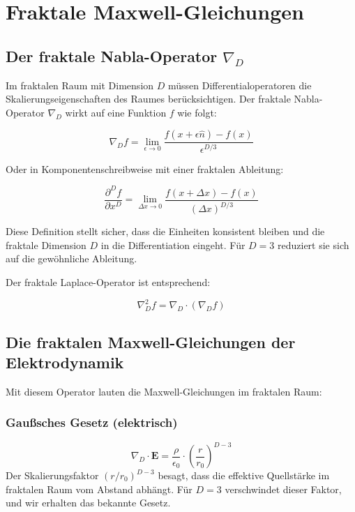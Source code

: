 \documentclass[12pt,a4paper]{article}
\begin{document}
\section{Fraktale Maxwell-Gleichungen}

\subsection{Der fraktale Nabla-Operator $\nabla_D$}

Im fraktalen Raum mit Dimension $D$ müssen Differentialoperatoren die Skalierungseigenschaften des Raumes berücksichtigen. Der fraktale Nabla-Operator $\nabla_D$ wirkt auf eine Funktion $f$ wie folgt:

\begin{equation}
\nabla_D f = \lim_{\epsilon \to 0} \frac{f(x + \epsilon\hat{n}) - f(x)}{\epsilon^{D/3}}
\end{equation}

Oder in Komponentenschreibweise mit einer fraktalen Ableitung:

\begin{equation}
\frac{\partial^D f}{\partial x^D} = \lim_{\Delta x \to 0} \frac{f(x + \Delta x) - f(x)}{(\Delta x)^{D/3}}
\end{equation}

Diese Definition stellt sicher, dass die Einheiten konsistent bleiben und die fraktale Dimension $D$ in die Differentiation eingeht. Für $D = 3$ reduziert sie sich auf die gewöhnliche Ableitung.

Der fraktale Laplace-Operator ist entsprechend:

\begin{equation}
\nabla_D^2 f = \nabla_D \cdot (\nabla_D f)
\end{equation}

\subsection{Die fraktalen Maxwell-Gleichungen der Elektrodynamik}

Mit diesem Operator lauten die Maxwell-Gleichungen im fraktalen Raum:

\subsubsection{Gaußsches Gesetz (elektrisch)}
\begin{equation}
\nabla_D \cdot \mathbf{E} = \frac{\rho}{\epsilon_0} \cdot \left( \frac{r}{r_0} \right)^{D-3}
\end{equation}
Der Skalierungsfaktor $(r/r_0)^{D-3}$ besagt, dass die effektive Quellstärke im fraktalen Raum vom Abstand abhängt. Für $D = 3$ verschwindet dieser Faktor, und wir erhalten das bekannte Gesetz.
\end{document}

